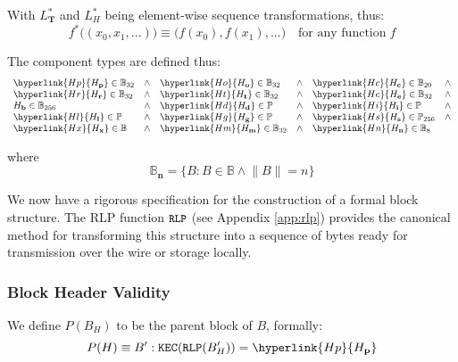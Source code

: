 \documentclass[9pt,oneside]{amsart}
\begin{document}
\begin{multicols}{2}
\hypertarget{f*}{
With $L_\mathbf{T}^*$ and $L_H^*$ being element-wise sequence transformations, thus:
\begin{equation}
f^*\big( (x_0, x_1, ...) \big) \equiv \big( f(x_0), f(x_1), ... \big) \quad \text{for any function} \; f
\end{equation}}

The component types are defined thus:
\begin{equation}
\begin{array}[t]{lclclcl}
\hyperlink{H p}{H_\mathbf{p}} \in \mathbb{B}_{32} & \wedge & \hyperlink{H o}{H_\mathbf{o}} \in \mathbb{B}_{32} & \wedge & \hyperlink{H c}{H_\mathbf{c}} \in \mathbb{B}_{20} & \wedge \\
\hyperlink{H r}{H_\mathbf{r}} \in \mathbb{B}_{32} & \wedge & \hyperlink{H t}{H_\mathbf{t}} \in \mathbb{B}_{32} & \wedge & \hyperlink{H e}{H_\mathbf{e}} \in \mathbb{B}_{32} & \wedge \\
H_\mathbf{b} \in \mathbb{B}_{256} & \wedge & \hyperlink{H d}{H_\mathbf{d}} \in \mathbb{P} & \wedge & \hyperlink{H i}{H_\mathbf{i}} \in \mathbb{P} & \wedge \\
\hyperlink{H l}{H_\mathbf{l}} \in \mathbb{P} & \wedge & \hyperlink{H g}{H_\mathbf{g}} \in \mathbb{P} & \wedge & \hyperlink{H s}{H_\mathbf{s}} \in \mathbb{P}_{256} & \wedge \\
\hyperlink{H x}{H_\mathbf{x}} \in \mathbb{B} & \wedge & \hyperlink{H m}{H_\mathbf{m}} \in \mathbb{B}_{32} & \wedge & \hyperlink{H n}{H_\mathbf{n}} \in \mathbb{B}_{8}
\end{array}
\end{equation}

where
\begin{equation}
\mathbb{B}_\mathbf{n} = \{ B: B \in \mathbb{B} \wedge \lVert B \rVert = n \}
\end{equation}

We now have a rigorous specification for the construction of a formal block structure. The RLP function $\texttt{\small RLP}$ (see Appendix \ref{app:rlp}) provides the canonical method for transforming this structure into a sequence of bytes ready for transmission over the wire or storage locally.

\subsubsection{Block Header Validity}

We define $P(B_H)$ to be the parent block of $B$, formally:
\begin{equation}
P(H) \equiv B': \mathtt{\tiny KEC}(\mathtt{\tiny RLP}(B'_H)) = \hyperlink{H p}{H_\mathbf{p}}
\end{equation}


\end{multicols}
\end{document}
